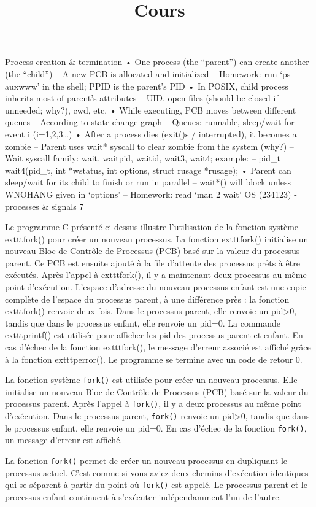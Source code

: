 \documentclass[11pt]{article}
\title{Cours}
\begin{document}
\maketitle

Process creation & termination
• One process (the “parent”) can create another (the “child”)
– A new PCB is allocated and initialized
– Homework: run ‘ps auxwww’ in the shell; PPID is the parent’s PID
• In POSIX, child process inherits most of parent’s attributes
– UID, open files (should be closed if unneeded; why?), cwd, etc.
• While executing, PCB moves between different queues
– According to state change graph 
– Queues: runnable, sleep/wait for event i (i=1,2,3…)
• After a process dies (exit()s / interrupted), it becomes a zombie
– Parent uses wait* syscall to clear zombie from the system (why?)
– Wait syscall family: wait, waitpid, waitid, wait3, wait4; example:
– pid_t wait4(pid_t, int *wstatus, int options, struct rusage *rusage); 
• Parent can sleep/wait for its child to finish or run in parallel
– wait*() will block unless WNOHANG given in ‘options’
– Homework: read ‘man 2 wait’
OS (234123) - processes & signals
7

Le programme C présenté ci-dessus illustre l'utilisation de la fonction système 	exttt{fork()} pour créer un nouveau processus. La fonction 	exttt{fork()} initialise un nouveau Bloc de Contrôle de Processus (PCB) basé sur la valeur du processus parent. Ce PCB est ensuite ajouté à la file d'attente des processus prêts à être exécutés. Après l'appel à 	exttt{fork()}, il y a maintenant deux processus au même point d'exécution. L'espace d'adresse du nouveau processus enfant est une copie complète de l'espace du processus parent, à une différence près : la fonction 	exttt{fork()} renvoie deux fois. Dans le processus parent, elle renvoie un pid>0, tandis que dans le processus enfant, elle renvoie un pid=0. La commande 	exttt{printf()} est utilisée pour afficher les pid des processus parent et enfant. En cas d'échec de la fonction 	exttt{fork()}, le message d'erreur associé est affiché grâce à la fonction 	exttt{perror()}. Le programme se termine avec un code de retour 0.
\begin{tcolorbox}[colback=yellow!5, colframe=yellow!80!black, title={\faBookmark À retenir}]
La fonction système \texttt{fork()} est utilisée pour créer un nouveau processus. Elle initialise un nouveau Bloc de Contrôle de Processus (PCB) basé sur la valeur du processus parent. Après l'appel à \texttt{fork()}, il y a deux processus au même point d'exécution. Dans le processus parent, \texttt{fork()} renvoie un pid>0, tandis que dans le processus enfant, elle renvoie un pid=0. En cas d'échec de la fonction \texttt{fork()}, un message d'erreur est affiché.
\end{tcolorbox}
\begin{tcolorbox}[colback=green!5, colframe=green!75!black, title={\faLightbulb Intuition}]
La fonction \texttt{fork()} permet de créer un nouveau processus en dupliquant le processus actuel. C'est comme si vous aviez deux chemins d'exécution identiques qui se séparent à partir du point où \texttt{fork()} est appelé. Le processus parent et le processus enfant continuent à s'exécuter indépendamment l'un de l'autre.
\end{tcolorbox}
\end{document}
